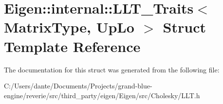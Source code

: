 \hypertarget{struct_eigen_1_1internal_1_1_l_l_t___traits}{}\section{Eigen\+::internal\+::L\+L\+T\+\_\+\+Traits$<$ Matrix\+Type, Up\+Lo $>$ Struct Template Reference}
\label{struct_eigen_1_1internal_1_1_l_l_t___traits}


The documentation for this struct was generated from the following file\+:\begin{DoxyCompactItemize}
\item 
C\+:/\+Users/dante/\+Documents/\+Projects/grand-\/blue-\/engine/reverie/src/third\+\_\+party/eigen/\+Eigen/src/\+Cholesky/L\+L\+T.\+h\end{DoxyCompactItemize}
